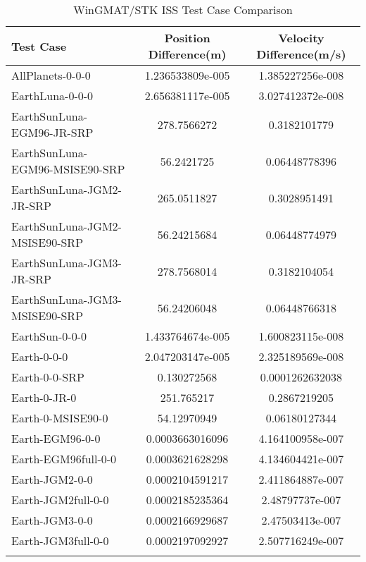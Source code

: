 \begin{table}[htbp!]
\centering
\caption{ WinGMAT/STK ISS Test Case Comparison}
      \begin{tabular}{lcc}
      \hline\hline
          Test Case & Position Difference(m) & Velocity Difference(m/s) \\
         \hline
         AllPlanets-0-0-0 & 1.236533809e-005 & 1.385227256e-008 \\
         EarthLuna-0-0-0 & 2.656381117e-005 & 3.027412372e-008 \\
         EarthSunLuna-EGM96-JR-SRP & 278.7566272 & 0.3182101779 \\
         EarthSunLuna-EGM96-MSISE90-SRP & 56.2421725 & 0.06448778396 \\
         EarthSunLuna-JGM2-JR-SRP & 265.0511827 & 0.3028951491 \\
         EarthSunLuna-JGM2-MSISE90-SRP & 56.24215684 & 0.06448774979 \\
         EarthSunLuna-JGM3-JR-SRP & 278.7568014 & 0.3182104054 \\
         EarthSunLuna-JGM3-MSISE90-SRP & 56.24206048 & 0.06448766318 \\
         EarthSun-0-0-0 & 1.433764674e-005 & 1.600823115e-008 \\
         Earth-0-0-0 & 2.047203147e-005 & 2.325189569e-008 \\
         Earth-0-0-SRP & 0.130272568 & 0.0001262632038 \\
         Earth-0-JR-0 & 251.765217 & 0.2867219205 \\
         Earth-0-MSISE90-0 & 54.12970949 & 0.06180127344 \\
         Earth-EGM96-0-0 & 0.0003663016096 & 4.164100958e-007 \\
         Earth-EGM96full-0-0 & 0.0003621628298 & 4.134604421e-007 \\
         Earth-JGM2-0-0 & 0.0002104591217 & 2.411864887e-007 \\
         Earth-JGM2full-0-0 & 0.0002185235364 & 2.48797737e-007 \\
         Earth-JGM3-0-0 & 0.0002166929687 & 2.47503413e-007 \\
         Earth-JGM3full-0-0 & 0.0002197092927 & 2.507716249e-007 \\
      \hline\hline
      \label{Table: ISS WinGMAT-STK Table} 
\end{tabular}
\end{table}
